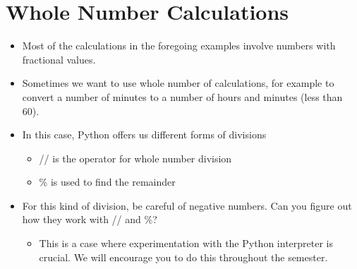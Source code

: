 \documentclass[letterpaper,10pt,english]{sphinxmanual}
\begin{document}
\section{Whole Number Calculations}
\label{\detokenize{lecture_notes/lec02_calculator:whole-number-calculations}}\begin{itemize}
\item {} 
Most of the calculations in the foregoing examples involve numbers
with fractional values.

\item {} 
Sometimes we want to use whole number of calculations, for example
to convert a number of minutes to a number of hours and minutes
(less than 60).

\item {} 
In this case, Python offers us different forms of divisions
\begin{itemize}
\item {} 
// is the operator for whole number division

\item {} 
\% is used to find the remainder

\end{itemize}

\item {} 
For this kind of division, be careful of negative numbers.  Can you
figure out how they work with // and \%?
\begin{itemize}
\item {} 
This is a case where experimentation with the Python interpreter
is crucial.  We will encourage you to do this throughout the
semester.

\end{itemize}

\end{itemize}
\end{document}
